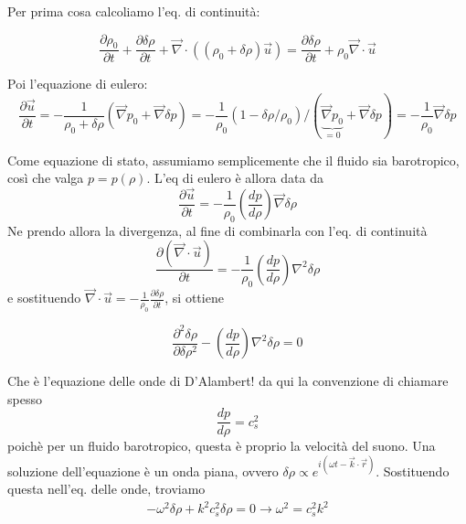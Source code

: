 \documentclass{report}
\begin{document}
Per prima cosa calcoliamo l'eq. di continuità: 

\begin{equation}
    \frac{\partial \rho_0}{\partial t} + \frac{\partial \delta \rho}{\partial t} + \vec{\nabla} \cdot ((\rho_0 + \delta\rho)\vec{u}) = \frac{\partial \delta \rho}{\partial t} + \rho_0\vec{\nabla} \cdot\vec{u} 
\end{equation}

Poi l'equazione di eulero: 
\begin{equation}
    \frac{\partial \vec{u}}{\partial t} = -\frac{1}{\rho_0 + \delta\rho}(\vec{\nabla}p_0 + \vec{\nabla}\delta p) = -\frac{1}{\rho_0}(1 - \delta\rho/\rho_0)/(\underbrace{\vec{\nabla}p_0}_{=0} + \vec{\nabla}\delta p) = -\frac{1}{\rho_0}\vec{\nabla}\delta p
\end{equation}

Come equazione di stato, assumiamo semplicemente che il fluido sia barotropico, così che valga $p = p(\rho)$. L'eq di eulero è allora data da 
\begin{equation}
    \frac{\partial \vec{u}}{\partial t} = -\frac{1}{\rho_0}\left(\frac{dp}{d\rho} \right)\vec{\nabla}\delta \rho
\end{equation}
Ne prendo allora la divergenza, al fine di combinarla con l'eq. di continuità
\begin{equation}
    \frac{\partial (\vec{\nabla}\cdot\vec{u})}{\partial t} = -\frac{1}{\rho_0}\left(\frac{dp}{d\rho} \right)\nabla^2\delta \rho
\end{equation}
e sostituendo $\vec{\nabla}\cdot \vec{u} = -\frac{1}{\rho_0}\frac{\partial \delta \rho}{\partial t}$, si ottiene 

\begin{tcolorbox}[colback=myg!15, colframe=black, boxrule=1pt]
\begin{equation}
    \frac{\partial ^2 \delta\rho}{\partial \delta\rho^2} - \left(\frac{dp}{d\rho} \right)\nabla^2\delta \rho = 0 
\end{equation}
\end{tcolorbox}

Che è l'equazione delle onde di D'Alambert! da qui la convenzione di chiamare spesso 
\begin{equation}
    \frac{dp}{d\rho} = c_s^2
\end{equation}
poichè per un fluido barotropico, questa è proprio la velocità del suono. Una soluzione dell'equazione è un onda piana, ovvero $\delta\rho \propto e^{i(\omega t - \vec{k}\cdot \vec{r})}$. Sostituendo questa nell'eq. delle onde, troviamo 
\begin{align}
    -\omega^2\delta\rho + k^2c_s^2\delta\rho = 0 \rightarrow \omega^2 = c_s^2k^2
\end{align}
\end{document}

